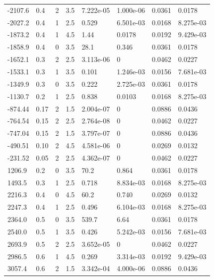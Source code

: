 \documentclass[preview]{standalone}
\begin{document}
{{\begin{tabular}{L{1.2cm}C{1.2cm} C{0.3cm}C{0.5cm} C{1.4cm}C{1.4cm} C{1.4cm}C{1.4cm}}
  -2107.6  &   0.4  & 2     & 3.5 &  7.222e-05  & 1.000e-06  & 0.0361 &  0.0178   \\ 
  -2027.2  &   0.4  & 1     & 2.5 &  0.529  & 6.501e-03  & 0.0168 &  8.275e-03   \\ 
  -1873.2  &   0.4  & 1     & 4.5 &  1.44  & 0.0178  & 0.0192 &  9.429e-03   \\ 
  -1858.9  &   0.4  & 0     & 3.5 &  28.1  & 0.346  & 0.0361 &  0.0178   \\ 
  -1652.1  &   0.3  & 2     & 2.5 &  3.113e-06  & 0  & 0.0462 &  0.0227   \\ 
  -1533.1  &   0.3  & 1     & 3.5 &  0.101  & 1.246e-03  & 0.0156 &  7.681e-03   \\ 
  -1349.9  &   0.3  & 0     & 3.5 &  0.222  & 2.725e-03  & 0.0361 &  0.0178   \\ 
  -1130.7  &   0.2  & 1     & 2.5 &  0.838  & 0.0103  & 0.0168 &  8.275e-03   \\ 
  -874.44  &  0.17  & 2     & 1.5 &  2.004e-07  & 0  & 0.0886 &  0.0436   \\ 
  -764.54  &  0.15  & 2     & 2.5 &  2.764e-08  & 0  & 0.0462 &  0.0227   \\ 
  -747.04  &  0.15  & 2     & 1.5 &  3.797e-07  & 0  & 0.0886 &  0.0436   \\ 
  -490.51  &  0.10  & 2     & 4.5 &  4.581e-06  & 0  & 0.0269 &  0.0132   \\ 
  -231.52  &  0.05  & 2     & 2.5 &  4.362e-07  & 0  & 0.0462 &  0.0227   \\ 
  1206.9  &   0.2  & 0     & 3.5 &  70.2  & 0.864  & 0.0361 &  0.0178   \\ 
  1493.5  &   0.3  & 1     & 2.5 &  0.718  & 8.834e-03  & 0.0168 &  8.275e-03   \\ 
  2216.3  &   0.4  & 0     & 4.5 &  60.2  & 0.740  & 0.0269 &  0.0132   \\ 
  2247.3  &   0.4  & 1     & 2.5 &  0.496  & 6.104e-03  & 0.0168 &  8.275e-03   \\ 
  2364.0  &   0.5  & 0     & 3.5 &  539.7  & 6.64  & 0.0361 &  0.0178   \\ 
  2540.0  &   0.5  & 1     & 3.5 &  0.426  & 5.242e-03  & 0.0156 &  7.681e-03   \\ 
  2693.9  &   0.5  & 2     & 2.5 &  3.652e-05  & 0  & 0.0462 &  0.0227   \\ 
  2986.5  &   0.6  & 1     & 4.5 &  0.269  & 3.314e-03  & 0.0192 &  9.429e-03   \\ 
  3057.4  &   0.6  & 2     & 1.5 &  3.342e-04  & 4.000e-06  & 0.0886 &  0.0436   \\ 

\end{tabular}}}
\end{document}
